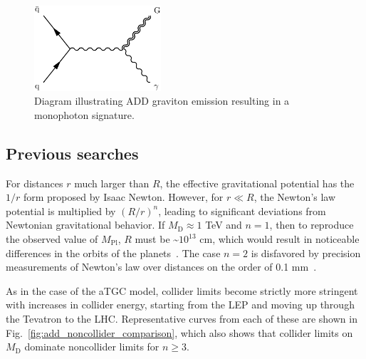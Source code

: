 \documentclass[oneside, letterpaper, 12pt, oldfontcommands]{memoir}
\begin{document}
\begin{figure}[hbtp]
  \begin{center}
    \includegraphics[width=0.42\textwidth]{Figures/add.pdf}
    \caption{
      Diagram illustrating ADD graviton emission resulting in a monophoton signature.
    }
    \label{fig:add_diagram}
  \end{center}
\end{figure}

\subsection{Previous searches} \label{sec:introduction_ADD_previous_searches}
For distances $r$ much larger than $R$, the effective gravitational potential has the $1/r$ form proposed by Isaac Newton.
However, for $r \ll R$, the Newton's law potential is multiplied by $(R/r)^{n}$, leading to significant deviations from Newtonian gravitational behavior.
If $M_\mathrm{D} \approx 1$ TeV and $n = 1$, then to reproduce the observed value of $M_\mathrm{Pl}$, $R$ must be \textasciitilde$10^{13}$ cm, which
would result in noticeable differences in the orbits of the planets~\cite{ref:S0370-2693(98)00466-3}. The case $n = 2$ is disfavored by precision
measurements of Newton's law over distances on the order of 0.1 mm~\cite{ref:0264-9381/32/3/033001}.

As in the case of the aTGC model, collider limits
become strictly more stringent with increases in collider energy, starting from the LEP and moving up through the Tevatron to the LHC.
Representative curves from each of these are shown in Fig.~\ref{fig:add_noncollider_comparison}, which also shows that collider limits
on $M_\mathrm{D}$ dominate noncollider limits for $n \geq 3$.
\end{document}
